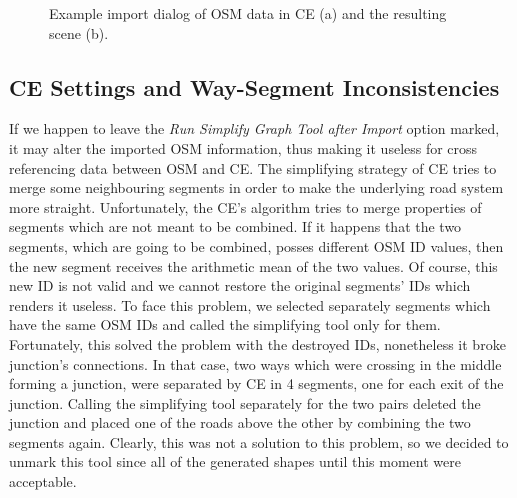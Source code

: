 \begin{figure}[htb]
	\centering
	\caption{Example import dialog of OSM data in CE (a) and the resulting scene (b).}
\end{figure}

\subsection{CE Settings and Way-Segment Inconsistencies}
If we happen to leave the \emph{Run Simplify Graph Tool after Import} option marked, it may alter the imported OSM information, thus making it useless for cross referencing data between OSM and CE. The simplifying strategy of CE tries to merge some neighbouring segments in order to make the underlying road system more straight. Unfortunately, the CE's algorithm tries to merge properties of segments which are not meant to be combined. If it happens that the two segments, which are going to be combined, posses different OSM ID values, then the new segment receives the arithmetic mean of the two values. Of course, this new ID is not valid and we cannot restore the original segments' IDs which renders it useless. To face this problem, we selected separately segments which have the same OSM IDs and called the simplifying tool only for them. Fortunately, this solved the problem with the destroyed IDs, nonetheless it broke junction's connections. In that case, two ways which were crossing in the middle forming a junction, were separated by CE in 4 segments, one for each exit of the junction. Calling the simplifying tool separately for the two pairs deleted the junction and placed one of the roads above the other by combining the two segments again. Clearly, this was not a solution to this problem, so we decided to unmark this tool since all of the generated shapes until this moment were acceptable.  

